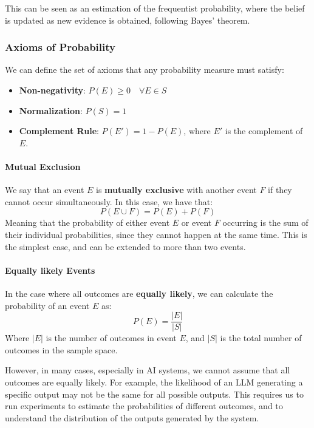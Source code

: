 This can be seen as an estimation of the frequentist probability, where the belief is updated as new evidence is obtained, following Bayes' theorem.

\subsubsection{Axioms of Probability}
We can define the set of axioms that any probability measure must satisfy:
\begin{itemize}
    \item \textbf{Non-negativity}: $P(E) \geq 0 \quad \forall E \in S$
    \item \textbf{Normalization}: $P(S) = 1$
    \item \textbf{Complement Rule}: $P(E') = 1 - P(E)$, where $E'$ is the complement of $E$.
\end{itemize}

\paragraph{Mutual Exclusion}
We say that an event $E$ is \textbf{mutually exclusive} with another event $F$ if they cannot occur simultaneously. 
In this case, we have that:
\begin{equation}
    P(E \cup F) = P(E) + P(F)
\end{equation}
Meaning that the probability of either event $E$ or event $F$ occurring is the sum of their individual probabilities, since they cannot happen at the same time.
This is the simplest case, and can be extended to more than two events.

\paragraph{Equally likely Events}
In the case where all outcomes are \textbf{equally likely}, we can calculate the probability of an event $E$ as:
\begin{equation}
    P(E) = \frac{|E|}{|S|}
\end{equation}
Where $|E|$ is the number of outcomes in event $E$, and $|S|$ is the total number of outcomes in the sample space.

However, in many cases, especially in AI systems, we cannot assume that all outcomes are equally likely.
For example, the likelihood of an LLM generating a specific output may not be the same for all possible outputs.
This requires us to run experiments to estimate the probabilities of different outcomes, and to understand the distribution of the outputs generated by the system.


